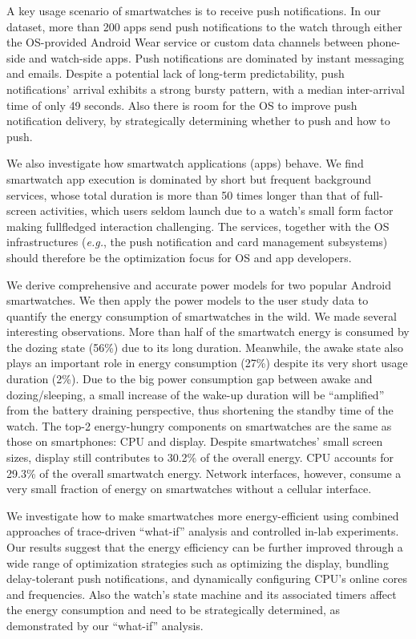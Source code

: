 \BULLET A key usage scenario of smartwatches is to receive push
notifications. In our dataset, more than 200 apps send push
notifications to the watch through either the OS-provided Android
Wear service or custom data channels between phone-side and
watch-side apps. Push notifications are dominated by instant
messaging and emails. Despite a potential lack of long-term
predictability, push notifications’ arrival exhibits a strong bursty
pattern, with a median inter-arrival time of only 49 seconds. Also
there is room for the OS to improve push notification delivery, by
strategically determining whether to push and how to push.

\BULLET We also investigate how smartwatch applications (apps) behave.
We find smartwatch app execution is dominated by short but
frequent background services, whose total duration is more than
50 times longer than that of full-screen activities, which users
seldom launch due to a watch’s small form factor making fullfledged
interaction challenging. The services, together with the
OS infrastructures (\emph{e.g.}, the push notification and card management
subsystems) should therefore be the optimization focus for OS and
app developers.

\BULLET We derive comprehensive and accurate power models for two
popular Android smartwatches. We then apply the power
models to the user study data to quantify the energy consumption
of smartwatches in the wild. We made several interesting
observations. More than half of the smartwatch energy is consumed
by the dozing state (56\%) due to its long duration. Meanwhile, the
awake state also plays an important role in energy consumption
(27\%) despite its very short usage duration (2\%). Due to the
big power consumption gap between awake and dozing/sleeping,
a small increase of the wake-up duration will be ``amplified'' from
the battery draining perspective, thus shortening the standby time of
the watch. The top-2 energy-hungry components on smartwatches
are the same as those on smartphones: CPU and display. Despite
smartwatches’ small screen sizes, display still contributes to 30.2\%
of the overall energy. CPU accounts for 29.3\% of the overall
smartwatch energy. Network interfaces, however, consume a
very small fraction of energy on smartwatches without a cellular
interface.

\BULLET We investigate how to make smartwatches more energy-efficient
using combined approaches of trace-driven ``what-if'' analysis
and controlled in-lab experiments. Our results suggest that
the energy efficiency can be further improved through a wide
range of optimization strategies such as optimizing the display,
bundling delay-tolerant push notifications, and dynamically
configuring CPU’s online cores and frequencies. Also the watch’s
state machine and its associated timers affect the
energy consumption and need to be strategically determined, as
demonstrated by our ``what-if'' analysis. 

